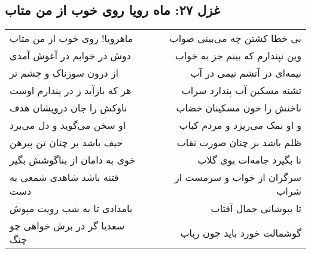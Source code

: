 \begin{center}
\section*{غزل ۲۷: ماه رویا روی خوب از من متاب}
\label{sec:027}
\begin{longtable}{l p{0.5cm} r}
ماهرویا! روی خوب از من متاب
&&
بی خطا کشتن چه می‌بینی صواب
\\
دوش در خوابم در آغوش آمدی
&&
وین نپندارم که بینم جز به خواب
\\
از درون سوزناک و چشم تر
&&
نیمه‌ای در آتشم نیمی در آب
\\
هر که بازآید ز در پندارم اوست
&&
تشنه مسکین آب پندارد سراب
\\
ناوکش را جان درویشان هدف
&&
ناخنش را خون مسکینان خضاب
\\
او سخن می‌گوید و دل می‌برد
&&
و او نمک می‌ریزد و مردم کباب
\\
حیف باشد بر چنان تن پیرهن
&&
ظلم باشد بر چنان صورت نقاب
\\
خوی به دامان از بناگوشش بگیر
&&
تا بگیرد جامه‌ات بوی گلاب
\\
فتنه باشد شاهدی شمعی به دست
&&
سرگران از خواب و سرمست از شراب
\\
بامدادی تا به شب رویت مپوش
&&
تا بپوشانی جمال آفتاب
\\
سعدیا گر در برش خواهی چو چنگ
&&
گوشمالت خورد باید چون رباب
\\
\end{longtable}
\end{center}
